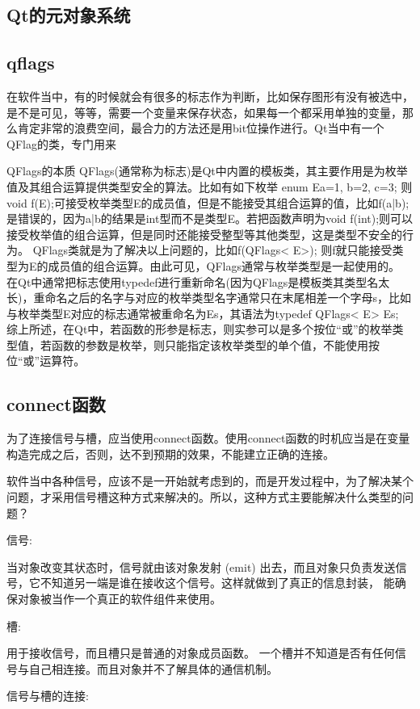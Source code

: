 \subsection{Qt的元对象系统}

\subsection{qflags}
在软件当中，有的时候就会有很多的标志作为判断，比如保存图形有没有被选中，是不是可见，等等，需要一个变量来保存状态，如果每一个都采用单独的变量，那么肯定非常的浪费空间，最合力的方法还是用bit位操作进行。Qt当中有一个QFlag的类，专门用来

QFlags的本质
QFlags(通常称为标志)是Qt中内置的模板类，其主要作用是为枚举值及其组合运算提供类型安全的算法。比如有如下枚举
enum E{a=1, b=2, c=3};
则void f(E);可接受枚举类型E的成员值，但是不能接受其组合运算的值，比如f(a|b);是错误的，因为a|b的结果是int型而不是类型E。若把函数声明为void f(int);则可以接受枚举值的组合运算，但是同时还能接受整型等其他类型，这是类型不安全的行为。
QFlags类就是为了解决以上问题的，比如f(QFlags< E>); 则f就只能接受类型为E的成员值的组合运算。由此可见，QFlags通常与枚举类型是一起使用的。
在Qt中通常把标志使用typedef进行重新命名(因为QFlags是模板类其类型名太长)，重命名之后的名字与对应的枚举类型名字通常只在末尾相差一个字母s，比如与枚举类型E对应的标志通常被重命名为Es，其语法为typedef QFlags< E> Es;
综上所述，在Qt中，若函数的形参是标志，则实参可以是多个按位“或”的枚举类型值，若函数的参数是枚举，则只能指定该枚举类型的单个值，不能使用按位“或”运算符。
\subsection{connect函数}
为了连接信号与槽，应当使用connect函数。使用connect函数的时机应当是在变量构造完成之后，否则，达不到预期的效果，不能建立正确的连接。

软件当中各种信号，应该不是一开始就考虑到的，而是开发过程中，为了解决某个问题，才采用信号槽这种方式来解决的。所以，这种方式主要能解决什么类型的问题？

信号:

当对象改变其状态时，信号就由该对象发射 (emit) 出去，而且对象只负责发送信号，它不知道另一端是谁在接收这个信号。这样就做到了真正的信息封装，
能确保对象被当作一个真正的软件组件来使用。

槽:

用于接收信号，而且槽只是普通的对象成员函数。
一个槽并不知道是否有任何信号与自己相连接。而且对象并不了解具体的通信机制。

信号与槽的连接:

